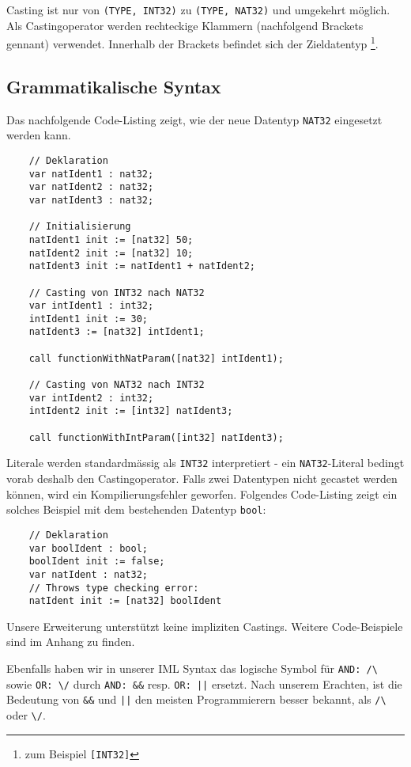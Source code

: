 \documentclass[10pt, a4paper, twocolumn]{article} %
\begin{document}
Casting ist nur von \texttt{(TYPE, INT32)} zu \texttt{(TYPE, NAT32)} und umgekehrt möglich.
Als Castingoperator werden rechteckige Klammern (nachfolgend Brackets gennant) verwendet.
Innerhalb der Brackets befindet sich der Zieldatentyp \footnote{zum Beispiel \texttt{[INT32]}}.

\subsection{Grammatikalische Syntax}
Das nachfolgende Code-Listing zeigt, wie der neue Datentyp \texttt{NAT32} eingesetzt werden kann.
\begin{lstlisting}
    // Deklaration
    var natIdent1 : nat32;
    var natIdent2 : nat32;
    var natIdent3 : nat32;

    // Initialisierung
    natIdent1 init := [nat32] 50;
    natIdent2 init := [nat32] 10;
    natIdent3 init := natIdent1 + natIdent2;

    // Casting von INT32 nach NAT32
    var intIdent1 : int32;
    intIdent1 init := 30;
    natIdent3 := [nat32] intIdent1;

    call functionWithNatParam([nat32] intIdent1);

    // Casting von NAT32 nach INT32
    var intIdent2 : int32;
    intIdent2 init := [int32] natIdent3;

    call functionWithIntParam([int32] natIdent3);
\end{lstlisting}
Literale werden standardmässig als \texttt{INT32} interpretiert - ein \texttt{NAT32}-Literal bedingt vorab deshalb den Castingoperator.
Falls zwei Datentypen nicht gecastet werden können, wird ein Kompilierungsfehler geworfen.
Folgendes Code-Listing zeigt ein solches Beispiel mit dem bestehenden Datentyp \texttt{bool}:
\begin{lstlisting}
    // Deklaration
    var boolIdent : bool;
    boolIdent init := false;
    var natIdent : nat32;
    // Throws type checking error:
    natIdent init := [nat32] boolIdent
\end{lstlisting}
Unsere Erweiterung unterstützt keine impliziten Castings.
Weitere Code-Beispiele sind im Anhang zu finden.

Ebenfalls haben wir in unserer IML Syntax das logische Symbol für \texttt{AND: /\textbackslash{}} sowie \texttt{OR: \textbackslash{}/} durch \texttt{AND: \&\&} resp. \texttt{OR: ||} ersetzt.
Nach unserem Erachten, ist die Bedeutung von \texttt{\&\&} und \texttt{||} den meisten Programmierern besser bekannt, als \texttt{/\textbackslash{}} oder \texttt{\textbackslash{}/}.
\end{document}
